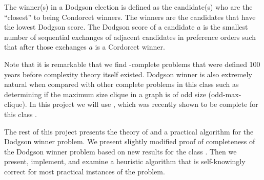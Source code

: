 The winner(s) in a Dodgson election is defined as the candidate(s) who are
the ``closest'' to being Condorcet winners.
The winners are the candidates that have the lowest Dodgson score.
The Dodgson score of a candidate $a$ is the smallest number of
sequential exchanges of adjacent candidates in preference orders such that
after those exchanges $a$ is a Cordorcet winner.

Note that it is remarkable that we find \tp-complete problems that were defined
100 years before complexity theory itself existed.
Dodgson winner is also extremely natural when compared with other complete
problems in this class such as determining if the maximum size clique in a
graph is of odd size (odd-max-clique).
In this project we will use ,
which was recently shown to be complete for this class \citep{compsat}.


The rest of this project presents the theory of and a practical algorithm for
the Dodgson winner problem.
We present slightly modified proof of completeness of
the Dodgson winner problem based on new results for the class \tp.
Then we present, implement, and examine a heuristic algorithm
that is self-knowingly correct for most practical instances of the problem.



